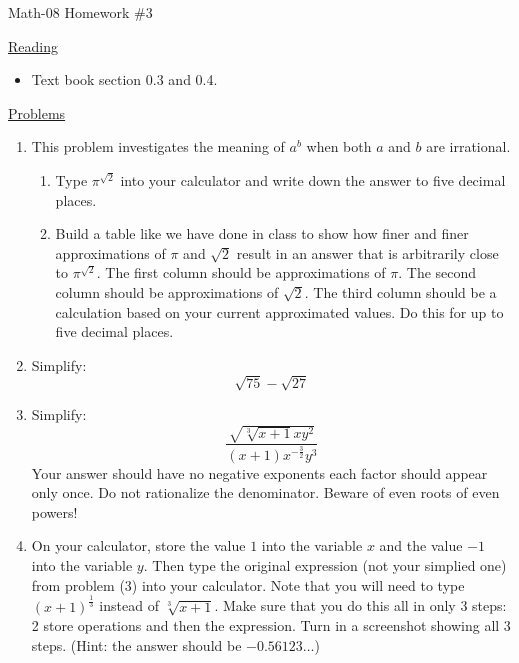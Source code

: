\documentclass[letterpaper,12pt,fleqn]{article}
\begin{document}
\begin{center}
\Large Math-08 Homework \#3
\end{center}

\vspace{0.5in}

\underline{Reading}

\begin{itemize}
\item Text book section 0.3 and 0.4.
\end{itemize}

\underline{Problems}

\begin{enumerate}
\item This problem investigates the meaning of $a^b$ when both $a$ and $b$ are
  irrational.
  \begin{enumerate}
  \item Type $\pi^{\sqrt{2}}$ into your calculator and write down the answer
    to five decimal places.
  \item Build a table like we have done in class to show how finer and finer
    approximations of $\pi$ and $\sqrt{2}$ result in an answer that is
    arbitrarily close to $\pi^{\sqrt{2}}$. The first column should be
    approximations of $\pi$. The second column should be approximations of
    $\sqrt{2}$. The third column should be a calculation based on your current
    approximated values. Do this for up to five decimal places.
  \end{enumerate}

\item Simplify:
  \[\sqrt{75}-\sqrt{27}\]

\item Simplify:
  \[\frac{\sqrt{\sqrt[3]{x+1}xy^2}}{(x+1)x^{-\frac{3}{2}}y^3}\]
  Your answer should have no negative exponents each factor should appear
  only once. Do not rationalize the denominator. Beware of even roots of
  even powers!

\item On your calculator, store the value $1$ into the variable $x$ and the
  value $-1$ into the variable $y$. Then type the original expression (not
  your simplied one) from problem (3) into your calculator. Note that you will
  need to type $(x+1)^{\frac{1}{3}}$ instead of $\sqrt[3]{x+1}$. Make sure that
  you do this all in only 3 steps: 2 store operations and then the expression.
  Turn in a screenshot showing all 3 steps. (Hint: the answer should be
  $-0.56123\ldots$)
\end{enumerate}
\end{document}
